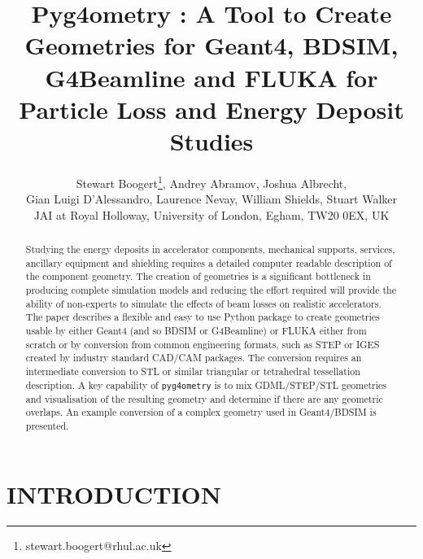 \documentclass[a4paper,
               keeplastbox,   %
               ]{jacow}
\begin{document}
\title{Pyg4ometry : A Tool to Create Geometries for Geant4, BDSIM, G4Beamline and FLUKA for Particle Loss and Energy Deposit Studies}

\author{Stewart Boogert\thanks{stewart.boogert@rhul.ac.uk}, Andrey Abramov, Joshua Albrecht, \\ Gian Luigi D'Alessandro, Laurence Nevay, William Shields, Stuart Walker \\
JAI at Royal Holloway, University of London, Egham, TW20 0EX, UK}

\maketitle

%
\begin{abstract}
Studying the energy deposits in accelerator components, mechanical supports, services, ancillary equipment and shielding requires a detailed computer readable description of the component geometry. The creation of geometries is a significant bottleneck in producing complete simulation models and reducing the effort required will provide the ability of non-experts to simulate the effects of beam losses on realistic accelerators. The paper describes a flexible and easy to use Python package to create geometries usable by either Geant4 (and so BDSIM or G4Beamline) or FLUKA either from scratch or by conversion from common engineering formats, such as STEP or IGES created by industry standard CAD/CAM packages. The conversion requires an intermediate conversion to STL or similar triangular or tetrahedral tessellation description. A key capability of \verb|pyg4ometry| is to mix GDML/STEP/STL geometries and visualisation of the resulting geometry and determine if there are any geometric overlaps. An example conversion of a complex geometry used in Geant4/BDSIM is presented.
\end{abstract}


\section{INTRODUCTION}
\end{document}
